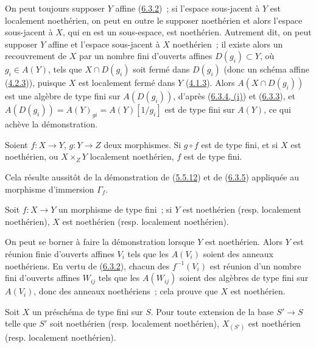 On peut toujours supposer $Y$ affine (\hyperref[I.6.3.2-fr]{6.3.2})~; si
l'espace sous-jacent à $Y$ est localement noethérien, on peut en outre le
supposer noethérien et alors l'espace sous-jacent à $X$, qui en est un
sous-espace, est noethérien. Autrement dit, on peut supposer $Y$ affine et
l'espace sous-jacent à $X$ noethérien~; il existe alors un recouvrement de $X$
par un nombre fini d'ouverts affines $D(g_i)\subset Y$, où $g_i\in A(Y)$, tels
que $X\cap D(g_i)$ soit fermé dans $D(g_i)$ (donc un schéma affine
(\hyperref[I.4.2.3-fr]{4.2.3})), puisque $X$ est localement fermé dans $Y$
(\hyperref[I.4.1.3-fr]{4.1.3}). Alors $A(X\cap D(g_i))$ est une algèbre de type
fini sur $A(D(g_i))$, d'après (\hyperref[I.6.3.4-fr]{6.3.4, (i)}) et
(\hyperref[I.6.3.3-fr]{6.3.3}), et
$A(D(g_i))=A(Y)_{gi}=A(Y)[1/g_i]$ est de type fini sur $A(Y)$, ce qui achève
la démonstration.

\begin{corollary}[6.3.6]
\label{I.6.3.6-fr}
Soient $f:X\to Y$, $g:Y\to Z$ deux morphismes. Si $g\circ f$ est de type fini,
et si $X$ est noethérien, ou $X\times_Z Y$ localement noethérien, $f$ est de
type fini.
\end{corollary}

Cela résulte aussitôt de la démonstration de
(\hyperref[I.5.5.12-fr]{5.5.12}) et de (\hyperref[I.6.3.5-fr]{6.3.5}) appliquée
au morphisme d'immersion $\Gamma_f$.

\begin{proposition}[6.3.7]
\label{I.6.3.7-fr}
Soit $f:X\to Y$ un morphisme de type fini~; si $Y$ est noethérien \textup{(resp.}
localement noethérien), $X$ est noethérien \textup{(resp.} localement noethérien).
\end{proposition}

On peut se borner à faire la démonstration lorsque $Y$ est noethérien. Alors $Y$
est réunion finie d'ouverts affines $V_i$ tels que les $A(V_i)$ soient des
anneaux noethériens. En vertu de (\hyperref[I.6.3.2-fr]{6.3.2}), chacun des
$f^{-1}(V_i)$ est réunion d'un nombre fini d'ouverts affines $W_{ij}$ tels que
les $A(W_{ij})$ soient des algèbres de type fini sur $A(V_i)$, donc des anneaux
noethériens~; cela prouve que $X$ est noethérien.

\begin{corollary}[6.3.8]
\label{I.6.3.8-fr}
Soit $X$ un préschéma de type fini sur $S$. Pour toute extension de la base
$S'\to S$ telle que $S'$ soit noethérien \textup{(resp.} localement noethérien),
$X_{(S')}$ est noethérien \textup{(resp.} localement noethérien).
\end{corollary}

